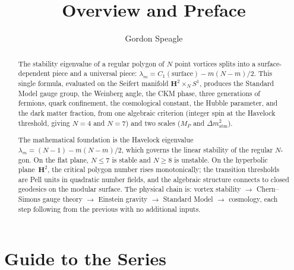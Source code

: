 










\title{\seriestitle\\[6pt]\large Overview and Preface}
\author{Gordon Speagle}
\date{}


\maketitle

\begin{abstract}
The stability eigenvalue of a regular polygon of $N$ point vortices
splits into a surface-dependent piece and a universal piece:
$\lambda_m = C_1(\text{surface}) - m(N{-}m)/2$.
This single formula, evaluated on the Seifert manifold
$\mathbf{H}^2 \times_N S^1$, produces the Standard Model gauge group,
the Weinberg angle, the CKM phase, three generations of fermions,
quark confinement, the cosmological constant, the Hubble parameter,
and the dark matter fraction, from one algebraic criterion
(integer spin at the Havelock threshold, giving $N = 4$ and $N = 7$)
and two scales ($M_P$ and $\Delta m^2_{\mathrm{atm}}$).

The mathematical foundation is the Havelock eigenvalue
$\lambda_m = (N{-}1) - m(N{-}m)/2$, which governs the linear stability
of the regular $N$-gon.  On the flat plane, $N \le 7$ is stable and
$N \ge 8$ is unstable.  On the hyperbolic plane~$\mathbf{H}^2$,
the critical polygon number rises monotonically; the transition
thresholds are Pell units in quadratic number fields, and the
algebraic structure connects to closed geodesics on the modular
surface.  The physical chain is:
vortex stability $\to$ Chern--Simons gauge theory $\to$
Einstein gravity $\to$ Standard Model $\to$ cosmology,
each step following from the previous with no additional inputs.
\end{abstract}

\tableofcontents

\section{Guide to the Series}

